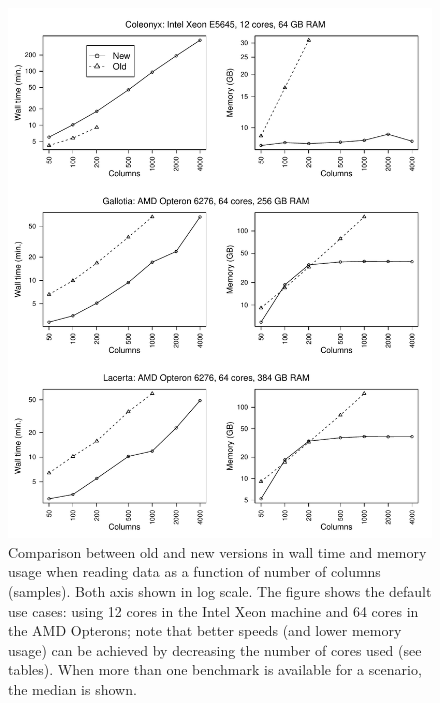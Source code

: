 \documentclass[a4paper,11pt]{article}
\begin{document}
\clearpage
\begin{figure}[h!]
\begin{center}
  \includegraphics[width=16.1cm,keepaspectratio]{reading-benchmark-fig.pdf}
\end{center}
\caption[Wall time and memory usage when reading data: version
comparison]{\label{fig-read} Comparison between old and new versions in
  wall time and memory usage when reading data as a function of number of
  columns (samples). Both axis shown in log scale. The figure shows the
  default use cases: using 12 cores in the Intel Xeon machine and 64 cores
  in the AMD Opterons; note that better speeds (and lower memory usage)
  can be achieved by decreasing the number of cores used (see
  tables). When more than one benchmark is available for a scenario, the
  median is shown.}
\end{figure}

\begin{center}

\clearpage

\clearpage

\end{center}
\end{document}
